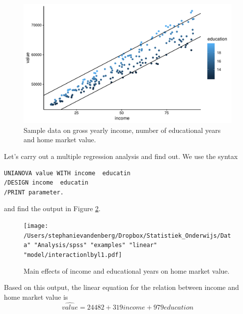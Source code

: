 \documentclass[]{book}\usepackage[]{graphicx}\usepackage[]{color}
\makeatletter
\def\maxwidth{ %
  \ifdim\Gin@nat@width>\linewidth
    \linewidth
  \else
    \Gin@nat@width
  \fi
}
\makeatother
\begin{document}
\begin{figure}

{\centering \includegraphics[width=\maxwidth]{figure/linearbylinear_1-1} 

}

\caption[Sample data on gross yearly income, number of educational years and home market value]{Sample data on gross yearly income, number of educational years and home market value.}\label{fig:linearbylinear_1}
\end{figure}




Let's carry out a multiple regression analysis and find out. We use the syntax

\begin{verbatim}
UNIANOVA value WITH income  educatin
/DESIGN income  educatin 
/PRINT parameter.
\end{verbatim}

and find the output in Figure \ref{fig:interactionlbyl1}. 

\begin{figure}[h]
    \begin{center}
       \texttt{[image: /Users/stephanievandenberg/Dropbox/Statistiek\_Onderwijs/Data" "Analysis/spss" "examples"  "linear" "model/interactionlbyl1.pdf]}
    \end{center}
    \caption{Main effects of income and educational years on home market value.}
    \label{fig:interactionlbyl1}
\end{figure}

Based on this output, the linear equation for the relation between income and home market value is 
\begin{equation}
\widehat{value}= 24482 + 319 income + 979 education
\end{equation}
\end{document}
